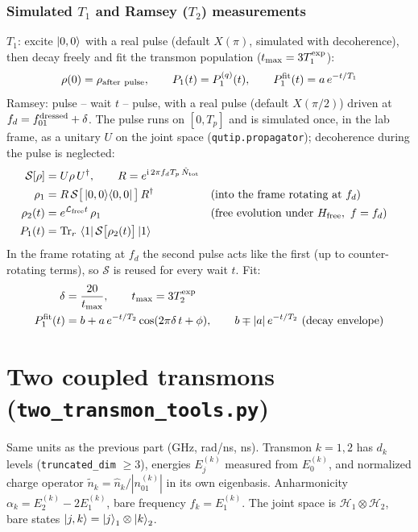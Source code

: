 \documentclass[11pt]{article}
\newcommand{\ii}{\mathrm{i}}
\newcommand{\nq}{\tilde n}
\begin{document}
\section*{Simulated $T_1$ and Ramsey ($T_2$) measurements}
$T_1$: excite $\ket{0,0}$ with a real pulse (default $X(\pi)$, simulated with decoherence), then
decay freely and fit the transmon population ($t_{\max} = 3T_1^{\rm exp}$):
\begin{equation}
  \rho(0) = \rho_{\rm after\ pulse}, \qquad P_1(t) = P^{(q)}_1(t), \qquad
  P_1^{\rm fit}(t) = a\,e^{-t/T_1}
\end{equation}
Ramsey: pulse -- wait $t$ -- pulse, with a real pulse (default $X(\pi/2)$) driven at
$f_d = f_{01}^{\rm dressed} + \delta$. The pulse runs on $[0, T_p]$ and is simulated once, in the
lab frame, as a unitary $U$ on the joint space (\texttt{qutip.propagator}); decoherence during the
pulse is neglected:
\begin{align}
  \mathcal{S}[\rho] &= U\rho\,U^{\dagger}, \qquad
  R = e^{\ii\,2\pi f_d T_p\,\hat N_{\rm tot}} \\
  \rho_1 &= R\,\mathcal{S}\big[\ket{0,0}\!\bra{0,0}\big]\,R^{\dagger}
  && \text{(into the frame rotating at } f_d) \\
  \rho_2(t) &= e^{\mathcal{L}_{\rm free}t}\,\rho_1
  && \text{(free evolution under } H_{\rm free},\ f = f_d) \\
  P_1(t) &= \mathrm{Tr}_r\,\braket{1|\,\mathcal{S}\big[\rho_2(t)\big]\,|1}
\end{align}
In the frame rotating at $f_d$ the second pulse acts like the first (up to counter-rotating
terms), so $\mathcal{S}$ is reused for every wait $t$. Fit:
\begin{align}
  \delta &= \frac{20}{t_{\max}}, \qquad t_{\max} = 3T_2^{\rm exp} \\
  P_1^{\rm fit}(t) &= b + a\,e^{-t/T_2}\cos(2\pi\delta\,t + \phi), \qquad
  b \mp |a|\,e^{-t/T_2} \ \text{(decay envelope)}
\end{align}

\part*{Two coupled transmons (\texttt{two\_transmon\_tools.py})}
\noindent Same units as the previous part (GHz, rad/ns, ns). Transmon $k = 1,2$ has $d_k$ levels
(\texttt{truncated\_dim} $\ge 3$), energies $E^{(k)}_j$ measured from $E^{(k)}_0$, and normalized
charge operator $\nq_k = \hat n_k/|n^{(k)}_{01}|$ in its own eigenbasis. Anharmonicity
$\alpha_k = E^{(k)}_2 - 2E^{(k)}_1$, bare frequency $f_k = E^{(k)}_1$. The joint space is
$\mathcal{H}_1\otimes\mathcal{H}_2$, bare states $\ket{j,k} = \ket{j}_1\otimes\ket{k}_2$.
\end{document}
